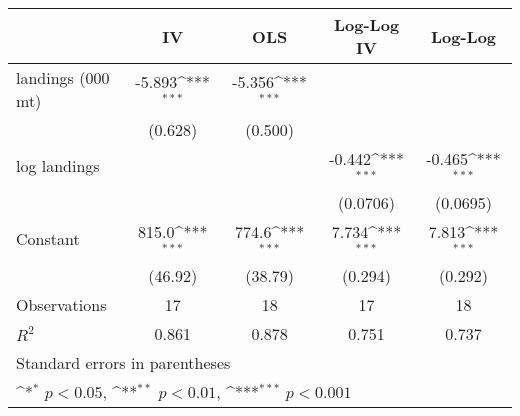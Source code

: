 {
\def\sym#1{\ifmmode^{#1}\else\(^{#1}\)\fi}
\begin{tabular}{l*{4}{c}}
\hline\hline
                &       IV         &      OLS         &Log-Log IV         &  Log-Log         \\
\hline
landings (000 mt)&   -5.893\sym{***}&   -5.356\sym{***}&                  &                  \\
                &  (0.628)         &  (0.500)         &                  &                  \\
[1em]
log landings    &                  &                  &   -0.442\sym{***}&   -0.465\sym{***}\\
                &                  &                  & (0.0706)         & (0.0695)         \\
[1em]
Constant        &    815.0\sym{***}&    774.6\sym{***}&    7.734\sym{***}&    7.813\sym{***}\\
                &  (46.92)         &  (38.79)         &  (0.294)         &  (0.292)         \\
\hline
Observations    &       17         &       18         &       17         &       18         \\
\(R^{2}\)       &    0.861         &    0.878         &    0.751         &    0.737         \\
\hline\hline
\multicolumn{5}{l}{\footnotesize Standard errors in parentheses}\\
\multicolumn{5}{l}{\footnotesize \sym{*} \(p<0.05\), \sym{**} \(p<0.01\), \sym{***} \(p<0.001\)}\\
\end{tabular}
}
